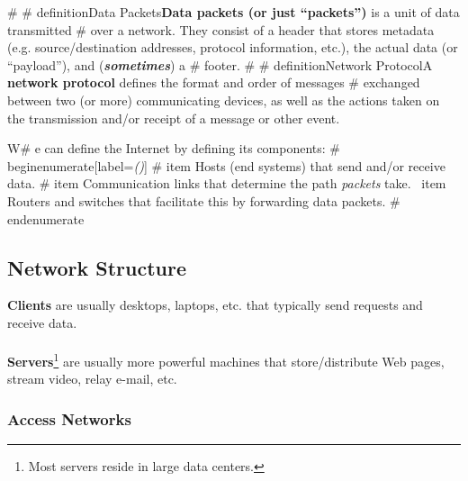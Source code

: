 \documentclass{report}
\newcommand{\definition}[2]{\begin{tcolorbox}[title={Definition: #1}]{#2}\end{tcolorbox}}
\begin{document}
 #
\# definition{Data Packets}{\textbf{Data packets (or just ``packets'')} is a unit of data transmitted
 #  over a network. They consist of a header that stores metadata (e.g. source/destination addresses,
    protocol information, etc.), the actual data (or ``payload''), and (\textit{\textbf{sometimes}}) a
 #  footer.}
 #
\# definition{Network Protocol}{A \textbf{network protocol} defines the format and order of messages
 #  exchanged between two (or more) communicating devices, as well as the actions taken on the
    transmission and/or receipt of a message or other event.}

W# e can define the Internet by defining its components:
\# begin{enumerate}[label=\textit{(\roman*)}]
\# item Hosts (end systems) that send and/or receive data.
\# item Communication links that determine the path \textit{packets} take.
\  item Routers and switches that facilitate this by forwarding data packets.
\# end{enumerate}


\subsection{Network Structure}
\definition{Network Edge}{}
\definition{Client and Server}{\textbf{Clients} are usually desktops, laptops, etc. that typically
  send requests and receive data. \\ \\
  \textbf{Servers}\footnote{Most servers reside in large data
    centers.} are usually more powerful machines that store/distribute Web pages, stream video, relay
  e-mail, etc.}

\subsubsection{Access Networks}
\end{document}
